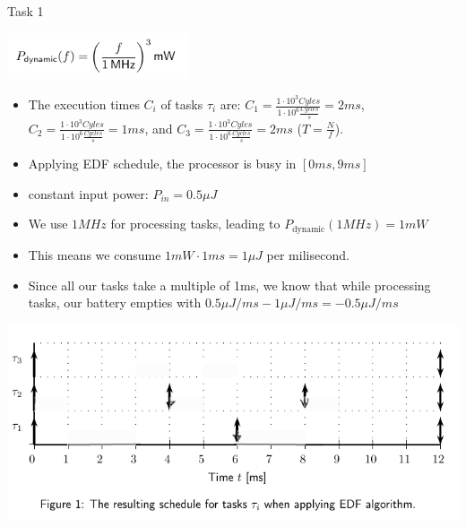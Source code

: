 \begin{frame}[allowframebreaks]{Task 1}{}
\begin{tasknoinc}
    \includegraphics[width=0.4\textwidth]{./figures/task1_power.png}
  \end{tasknoinc}
  \begin{solutionnoinc}
    \begin{itemize}
      \item The execution times $C_i$ of tasks $\tau_i$ are: $C_1 = \frac{1 \cdot 10^3 Cyles}{1 \cdot 10^6 \frac{Cycles}{s}} =  2 ms$, $C_2 = \frac{1 \cdot 10^3 Cyles}{1 \cdot 10^6 \frac{Cycles}{s}} =  1 ms$, and $C_3 = \frac{1 \cdot 10^3 Cyles}{1 \cdot 10^6 \frac{Cycles}{s}}  = 2 ms$ ($T = \frac{N}{f}$).
      \item Applying EDF schedule, the processor is busy in $[0 ms, 9 ms]$
      \item constant input power: $P_{in} = 0.5\mu J$
      \item We use $1MHz$ for processing tasks, leading to $P_{\text{dynamic}}(1MHz) = 1mW$
      \item This means we consume $1mW \cdot 1ms = 1\mu J$ per milisecond.
      \item Since all our tasks take a multiple of 1ms, we know that while processing tasks, our battery empties with $0.5\mu J/ms - 1\mu J/ms = -0.5\mu J/ms$
    \end{itemize}
  \end{solutionnoinc}
  \begin{solutionnoinc}
    \centering
    \includegraphics[height=0.6\paperheight]{./figures/task1_schedule_empty.png}
  \end{solutionnoinc}

\end{frame}

